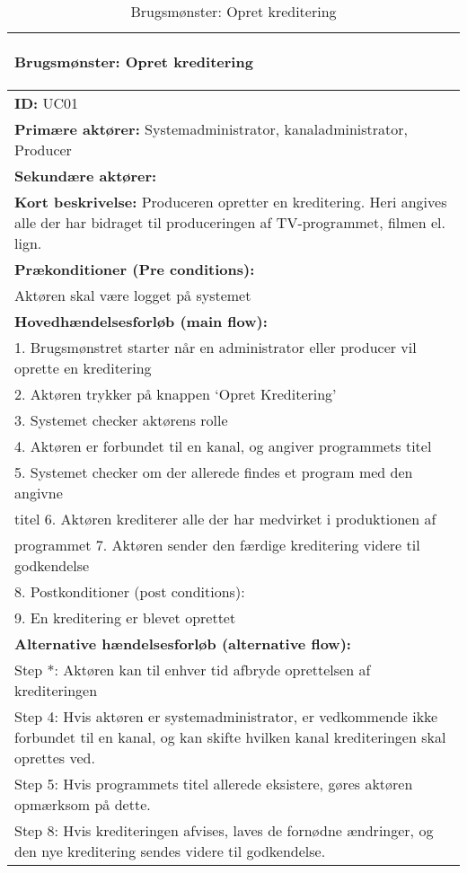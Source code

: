 \begin{table}[H]
\centering
\begin{tabular}{|p{16cm}|}
\hline
    \begin{center}{}
    \textbf{Brugsmønster:} Opret kreditering  
    \end{center} \\ \hline
    
	\textbf{ID:} UC01 \\ \hline
	\textbf{Primære aktører:} Systemadministrator, kanaladministrator, Producer \\ \hline
	\textbf{Sekundære aktører:} \\ \hline
	\textbf{Kort beskrivelse:} Produceren opretter en kreditering. Heri angives alle der har bidraget til produceringen af TV-programmet, filmen el. lign. \\ \hline
	\textbf{Prækonditioner (Pre conditions):} \\
Aktøren skal være logget på systemet \\ \hline
\textbf{Hovedhændelsesforløb (main flow):} \\
	1. Brugsmønstret starter når en administrator eller producer vil oprette en kreditering \\
	2. Aktøren trykker på knappen ‘Opret Kreditering’ \\
	3. Systemet checker aktørens rolle \\
	4. Aktøren er forbundet til en kanal, og angiver programmets titel \\
	5. Systemet checker om der allerede findes et program med den angivne \\ titel
	6. Aktøren krediterer alle der har medvirket i produktionen af \\ programmet
	7. Aktøren sender den færdige kreditering videre til godkendelse \\
	8. Postkonditioner (post conditions): \\
	9. En kreditering er blevet oprettet \\ \hline
	\textbf{Alternative hændelsesforløb (alternative flow):} \\
Step *: Aktøren kan til enhver tid afbryde oprettelsen af krediteringen \\
Step 4: Hvis aktøren er systemadministrator, er vedkommende ikke forbundet til en kanal, og kan skifte hvilken kanal krediteringen skal oprettes ved. \\

Step 5: Hvis programmets titel allerede eksistere, gøres aktøren opmærksom på dette. \\

Step 8: Hvis krediteringen afvises, laves de fornødne ændringer, og den nye kreditering sendes videre til godkendelse. \\
\hline
\end{tabular}
\label{tab:create_credits}
\caption{Brugsmønster: Opret kreditering}
\end{table}

